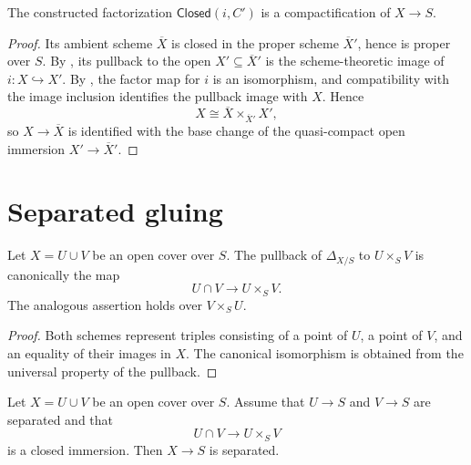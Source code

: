\begin{proposition}
  \label{prop:nagata-closed-subscheme-compactifiable}

  The constructed factorization $\mathsf{Closed}(i,C')$ is a compactification
  of $X\to S$.
\end{proposition}

\begin{proof}
  Its ambient scheme $\overline X$ is closed in the proper scheme
  $\overline X'$, hence is proper over $S$.  By
  , its pullback to the open
  $X'\subseteq\overline X'$ is the scheme-theoretic image of
  $i\colon X\hookrightarrow X'$.  By
  , the factor map for
  $i$ is an isomorphism, and compatibility with the image inclusion identifies
  the pullback image with $X$.  Hence
  \[
    X\cong\overline X\times_{\overline X'}X',
  \]
  so $X\to\overline X$ is identified with the base change of the
  quasi-compact open immersion $X'\to\overline X'$.
\end{proof}

\section{Separated gluing}

\begin{lemma}
  \label{lemma:nagata-diagonal-mixed-open}

  Let $X=U\cup V$ be an open cover over $S$.  The pullback of
  $\Delta_{X/S}$ to $U\times_SV$ is canonically the map
  \[
    U\cap V\longrightarrow U\times_SV.
  \]
  The analogous assertion holds over $V\times_SU$.
\end{lemma}

\begin{proof}
  Both schemes represent triples consisting of a point of $U$, a point of
  $V$, and an equality of their images in $X$.  The canonical isomorphism is
  obtained from the universal property of the pullback.
\end{proof}

\begin{lemma}
  \label{lemma:nagata-separated-two-open-cover}

  Let $X=U\cup V$ be an open cover over $S$.  Assume that $U\to S$ and
  $V\to S$ are separated and that
  \[
    U\cap V\longrightarrow U\times_SV
  \]
  is a closed immersion.  Then $X\to S$ is separated.
\end{lemma}

